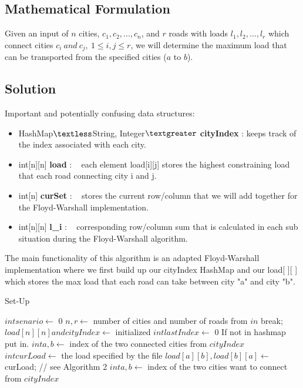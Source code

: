 \documentclass[12pt]{article}
\begin{document}
\newpage

\subsection{Mathematical Formulation}
Given an input of $n$ cities, $c_1, c_2,..., c_n$, and $r$ roads with loads $l_1, l_2,..., l_r$ which connect
cities $c_i\ and\ c_j,\ 1 \leq i,j \leq r$, we will determine the maximum load that can be transported
from the specified cities ($a$ to $b$).


\subsection{Solution}
Important and potentially confusing data structures:
\begin{itemize}
    \item HashMap$\textless$String, Integer$\textgreater$ \textbf{cityIndex} : keeps track of the index associated
    with each city.
    \item int[n][n] \textbf{load} : ~ each element load[i][j] stores the highest constraining load that
    each road connecting city i and j.
    \item int[n] \textbf{curSet} : ~ stores the current row/column that we will add together for
    the Floyd-Warshall implementation.
    \item int[n][n] \textbf{l\_i} : ~ corresponding row/column sum that is calculated in each sub
    situation during the Floyd-Warshall algorithm.
\end{itemize}

The main functionality of this algorithm is an adapted Floyd-Warshall implementation
where we first build up our cityIndex HashMap and our load[ ][ ] which stores
the max load that each road can take between city "a" and city "b".

\begin{algorithm}[H]
\caption{Set-Up}
\begin{algorithmic}
        \State $int senario \gets$ 0
            \State $n, r \gets$ number of cities and number of roads from $in$
                break;
            \EndIf
            \State $load[n][n] and cityIndex \gets$ initialized
            \State $int lastIndex \gets$ 0
                \State If not in hashmap put in.
                \State $int a, b \gets$ index of the two connected cities from $cityIndex$
                \State $int curLoad \gets$ the load specified by the file
                \State $load[a][b], load[b][a] \gets$ curLoad;
            \EndFor
            \State {} // see Algorithm 2
            \State $int a, b \gets$ index of the two cities want to connect from $cityIndex$
            \State {}
        \EndWhile
    \EndProcedure
\end{algorithmic}
\end{algorithm}
\end{document}
